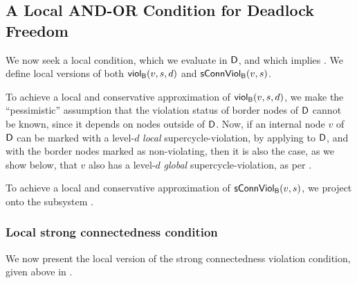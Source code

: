 

   \subsection{A Local AND-OR Condition for Deadlock Freedom}
   \label{s:ANDORcond}
%   



We now seek a local condition, which we evaluate in $\dsk{\act}{\l}$, and which implies \GAO.
We define local versions of both $\scViol{v}{d}{s}$ and $\connViol{v}{s}$.

To achieve a local and conservative approximation of $\scViol{v}{d}{s}$, we make the ``pessimistic'' assumption that the violation status of border
nodes of $\dsk{\act}{\l}$ cannot be known, since it depends on nodes outside of $\dsk{\act}{\l}$.  Now, if an internal node $v$ of $\dsk{\act}{\l}$
can be marked with a level-$d$ \emph{local} supercycle-violation, by applying  to $\dsk{\act}{\l}$, and with the
border nodes marked as non-violating, then it is also the case, as we show below, that $v$ also has a level-$d$ \emph{global} supercycle-violation, as per .

To achieve a local and conservative approximation of
$\connViol{v}{s}$, we project onto the subsystem \DS.


\subsubsection{Local strong connectedness condition}

We now present the local version of the strong connectedness violation condition, given above in .

